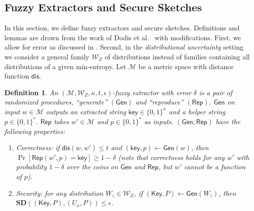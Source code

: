 \documentclass[11pt]{article}
\newcommand{\secref}[1]{\mbox{Section~\ref{#1}}}
\newcommand{\class}[1]{{\ensuremath{\mathsf{#1}}}}
\newcommand{\key}{\ensuremath{\class{key}}\xspace}
\newcommand{\Key}{\ensuremath{\class{Key}}\xspace}
\newcommand{\gen}{\ensuremath{\class{Gen}}\xspace}
\newcommand{\rep}{\ensuremath{\class{Rep}}\xspace}
\newcommand{\dis}{\ensuremath{\mathsf{dis}}}
\newcommand{\sd}{\ensuremath{\mathbf{SD}}}
\newtheorem{definition}[theorem]{Definition}
\begin{document}
\subsection{Fuzzy Extractors and Secure Sketches}\label{sec:fuzz extractor}

In this section, we define fuzzy extractors and secure sketches.  Definitions and lemmas are drawn from the work of Dodis et al.~\cite[Sections 2.5--4.1]{DBLP:journals/siamcomp/DodisORS08} with modifications.  First, we allow for error as discussed in \cite[Section 8]{DBLP:journals/siamcomp/DodisORS08}.  Second, in the \emph{distributional uncertainty} setting we consider a general family $\mathcal{W}_Z$ of distributions instead of families containing all distributions of a given min-entropy.
Let $\mathcal{M}$ be a metric space with distance function $\dis$.

\begin{definition}
\label{def:fuzzy extractor}
An $(\mathcal{M}, \mathcal{W}_Z, \kappa, t, \epsilon)$-\emph{fuzzy extractor} with error $\delta$ is a pair of randomized procedures, ``generate'' $(\gen)$ and ``reproduce'' $(\rep)$. \gen on input $w\in \mathcal{M}$ outputs an extracted string $\key \in\{0,1\}^\kappa$ and a helper string $p\in\{0,1\}^*$. \rep takes $w'\in\mathcal{M}$ and $p\in\{0,1\}^*$ as inputs.   $(\gen, \rep)$ have the following properties:
\begin{enumerate}
\item \emph{Correctness:} if $\dis(w, w')\leq t$ and $(\key, p)\leftarrow \gen(w)$, then $\Pr[\rep(w', p) = \key] \geq 1-\delta$ (note that correctness holds for any $w'$ with probability $1-\delta$ over the coins on $\gen$ and $\rep$, but $w'$ cannot be a function of $p$).
\item \emph{Security:} for any distribution $W_z\in\mathcal{W}_Z$, if $(\Key,P)\leftarrow\gen (W_z)$, then $\sd((\Key,P),(U_\kappa,P))\leq \epsilon$.
\end{enumerate}
\end{definition}
\end{document}
